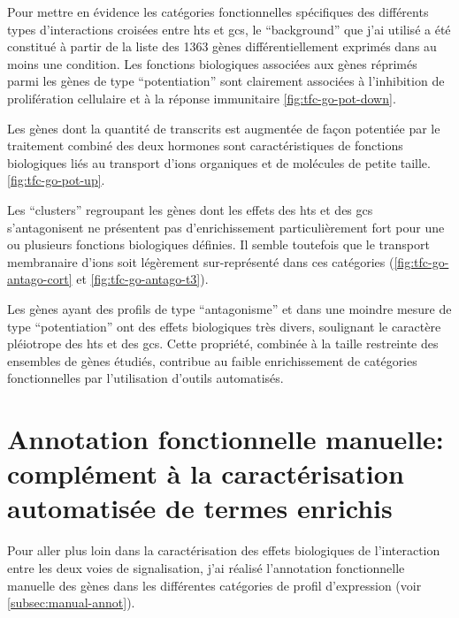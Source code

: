 \documentclass[../main.tex]{subfiles}
\begin{document}
	

	Pour mettre en évidence les catégories fonctionnelles spécifiques des différents types d'interactions croisées entre \glspl{ht} et \glspl{gc}, le ``background'' que j'ai utilisé a été constitué à partir de la liste des 1363 gènes différentiellement exprimés dans au moins une condition.
	Les fonctions biologiques associées aux gènes réprimés parmi les gènes de type ``potentiation'' sont clairement associées à l'inhibition de prolifération cellulaire et à la réponse immunitaire  \autoref{fig:tfc-go-pot-down}.

	

	Les gènes dont la quantité de transcrits est augmentée de façon potentiée par le traitement combiné des deux hormones sont caractéristiques de fonctions biologiques liés au transport d'ions organiques et de molécules de petite taille. \autoref{fig:tfc-go-pot-up}.

	

	Les ``clusters'' regroupant les gènes dont les effets des \glspl{ht} et des \glspl{gc} s'antagonisent ne présentent pas d'enrichissement particulièrement fort pour une ou plusieurs fonctions biologiques définies.
	Il semble toutefois que le transport membranaire d'ions soit légèrement sur-représenté dans ces catégories (\autoref{fig:tfc-go-antago-cort} et \autoref{fig:tfc-go-antago-t3}).

	

	

	Les gènes ayant des profils de type ``antagonisme'' et dans une moindre mesure de type ``potentiation'' ont des effets biologiques très divers, soulignant le caractère pléiotrope des \glspl{ht} et des \glspl{gc}.
	Cette propriété, combinée à la taille restreinte des ensembles de gènes étudiés, contribue au faible enrichissement de catégories fonctionnelles par l'utilisation d'outils automatisés.


\section{Annotation fonctionnelle manuelle: complément à la caractérisation automatisée de termes enrichis}

	Pour aller plus loin dans la caractérisation des effets biologiques de l'interaction entre les deux voies de signalisation, j'ai réalisé l'annotation fonctionnelle manuelle des gènes dans les différentes catégories de profil d'expression (voir \autoref{subsec:manual-annot}).
\end{document}
